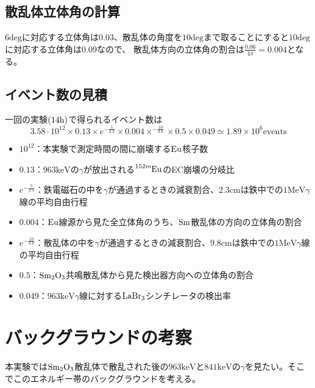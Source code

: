 \documentclass[dvipdfmx]{jreport}
\begin{document}
\subsection{散乱体立体角の計算}
$6\mathrm{deg}$に対応する立体角は$0.03$、散乱体の角度を$10\mathrm{deg}$まで取ることにすると$10\mathrm{deg}$に対応する立体角は$0.09$なので、
散乱体方向の立体角の割合は$\frac{0.06}{4\pi}=0.004$となる。

\subsection{イベント数の見積}
一回の実験$\qty(14\mathrm{h})$で得られるイベント数は
\begin{equation}
  3.58 \cdot 10^{12} \times 0.13  \times e^{-\frac{5}{2.3}} \times 0.004 \times ^{-\frac{10}{9.8}} \times 0.5 \times 0.049
  \simeq 1.89 \times 10^{6} \mathrm{events}
\end{equation}
\begin{itemize}
\item $10^{12}$：本実験で測定時間の間に崩壊する$\ce{Eu}$核子数
\item $0.13$：$963\mathrm{keV}$の$\gamma$が放出される$\ce{^{152m}Eu}$のEC崩壊の分岐比
\item $e^{-\frac{5}{2.3}}$：鉄電磁石の中を$\gamma$が通過するときの減衰割合、$2.3\mathrm{cm}$は鉄中での$1\mathrm{MeV} \gamma$線の平均自由行程
\item $0.004$：$\ce{Eu}$線源から見た全立体角のうち、$\ce{Sm}$散乱体の方向の立体角の割合
\item $e^{-\frac{10}{9.8}}$：散乱体の中を$\gamma$が通過するときの減衰割合、$9.8\mathrm{cm}$は鉄中での$1\mathrm{MeV} \gamma$線の平均自由行程  
\item $0.5$：$\ce{Sm_{2}O_{3}}$共鳴散乱体から見た検出器方向への立体角の割合
\item $0.049$：$963\mathrm{keV} \gamma$線に対する$\ce{LaBr_{3}}$シンチレータの検出率
\end{itemize}

\section{バックグラウンドの考察}
本実験では$\ce{Sm_{2}O_{3}}$散乱体で散乱された後の$963\mathrm{keV}$と$841\mathrm{keV}$の$\gamma$を見たい。そこでこのエネルギー帯のバックグラウンドを考える。
\end{document}
